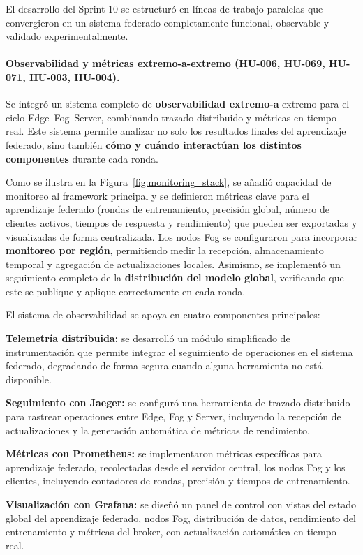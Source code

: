 \documentclass{report}
\begin{document}
El desarrollo del Sprint 10 se estructuró en líneas de trabajo paralelas que convergieron en un sistema federado completamente funcional, observable y validado experimentalmente.

\vspace{0.15em}
\paragraph{Observabilidad y métricas extremo-a-extremo (HU-006, HU-069, HU-071, HU-003, HU-004).}
Se integró un sistema completo de \textbf{observabilidad extremo-a} extremo para el ciclo Edge–Fog–Server, combinando trazado distribuido y métricas en tiempo real. Este sistema permite analizar no solo los resultados finales del aprendizaje federado, sino también \textbf{cómo y cuándo interactúan los distintos componentes} durante cada ronda.

Como se ilustra en la Figura~\ref{fig:monitoring_stack}, se añadió capacidad de monitoreo al framework principal y se definieron métricas clave para el aprendizaje federado (rondas de entrenamiento, precisión global, número de clientes activos, tiempos de respuesta y rendimiento) que pueden ser exportadas y visualizadas de forma centralizada.  
Los nodos Fog se configuraron para incorporar \textbf{monitoreo por región}, permitiendo medir la recepción, almacenamiento temporal y agregación de actualizaciones locales. Asimismo, se implementó un seguimiento completo de la \textbf{distribución del modelo global}, verificando que este se publique y aplique correctamente en cada ronda.

El sistema de observabilidad se apoya en cuatro componentes principales:

\textbf{Telemetría distribuida:} se desarrolló un módulo simplificado de instrumentación que permite integrar el seguimiento de operaciones en el sistema federado, degradando de forma segura cuando alguna herramienta no está disponible.

\textbf{Seguimiento con Jaeger:} se configuró una herramienta de trazado distribuido para rastrear operaciones entre Edge, Fog y Server, incluyendo la recepción de actualizaciones y la generación automática de métricas de rendimiento.

\textbf{Métricas con Prometheus:} se implementaron métricas específicas para aprendizaje federado, recolectadas desde el servidor central, los nodos Fog y los clientes, incluyendo contadores de rondas, precisión y tiempos de entrenamiento.

\textbf{Visualización con Grafana:} se diseñó un panel de control con vistas del estado global del aprendizaje federado, nodos Fog, distribución de datos, rendimiento del entrenamiento y métricas del broker, con actualización automática en tiempo real.
\end{document}

